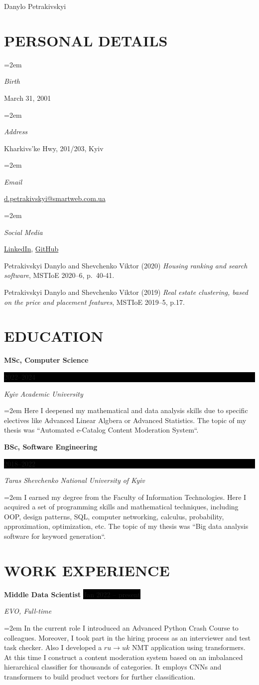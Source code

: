 \documentclass[paper=a4,fontsize=11pt]{scrartcl}
\newcommand{\sepspace}{\vspace*{1em}}
\newcommand{\MyName}[1]{
    \Huge \usefont{OT1}{phv}{b}{n} \hfill #1
    \par \normalsize \normalfont}
\newcommand{\NewPart}[1]{\section*{\uppercase{#1}}}
\newcommand{\PersonalEntry}[2]{
    \noindent\hangindent=2em\hangafter=0
    \parbox{6em}{\textit{#1}}
    \hspace{1.5em} #2 \par}
\newcommand{\EducationEntry}[4]{
    \noindent \textbf{#1} \hfill
    \colorbox{Black}{\parbox{6em}{\hfill\color{White}#2}} \par
    \noindent \textit{#3} \par
    \noindent\hangindent=2em\hangafter=0 \small #4
    \normalsize \par}
\newcommand{\WorkEntry}[4]{
    \noindent \textbf{#1} \hfill
    \colorbox{Black}{\color{White}#2} \par
    \noindent \textit{#3} \par
    \noindent\hangindent=2em\hangafter=0 \small #4
    \normalsize \par}
\begin{document}
    \MyName{Danylo Petrakivskyi}

    \sepspace

    \NewPart{Personal details}{} %

    \PersonalEntry{Birth}{March 31, 2001}
    \PersonalEntry{Address}{Kharkivs'ke Hwy, 201/203, Kyiv}
    \PersonalEntry{Email}{\url{d.petrakivskyi@smartweb.com.ua}}
    \PersonalEntry{Social Media}{\href{https://www.linkedin.com/in/danylo-petrakivskyi-916665174/}{LinkedIn},
        \href{https://github.com/xXxRisingTidexXx/}{GitHub}}

    \begin{thebibliography}{9} %
        Petrakivskyi Danylo and Shevchenko Viktor (2020) \emph{Housing ranking and search software}, MSTIoE 2020--6,
        p.~40-41.

        Petrakivskyi Danylo and Shevchenko Viktor (2019) \emph{Real estate clustering, based on the price and placement
        features}, MSTIoE 2019--5, p.17.
    \end{thebibliography}

    \NewPart{Education}{}

    \EducationEntry{MSc, Computer Science}{2022--2024}{Kyiv Academic University}{Here I deepened my mathematical and
    data analysis skills due to specific electives like Advanced Linear Algbera or Advanced Statistics. The topic of
    my thesis was ``Automated e-Catalog Content Moderation System``.}
    \sepspace

    \EducationEntry{BSc, Software Engineering}{2018--2022}{Taras Shevchenko National University of Kyiv}{I earned my
    degree from the Faculty of Information Technologies. Here I acquired a set of programming skills and mathematical
    techniques, including OOP, design patterns, SQL, computer networking, calculus, probability, approximation,
        optimization, etc. The topic of my thesis was ``Big data analysis software for keyword generation``.}

    \NewPart{Work experience}{}

    \WorkEntry{Middle Data Scientist}{Jan 2022 -- present}{EVO, Full-time}{In the current role I introduced an Advanced
    Python Crash Course to colleagues. Moreover, I took part in the hiring process as an interviewer and test task
    checker. Also I developed a $ru \rightarrow uk$ NMT application using transformers. At this time I construct a
    content moderation system based on an imbalanced hierarchical classifier for thousands of categories. It employs
    CNNs and transformers to build product vectors for further classification.}
\end{document}
